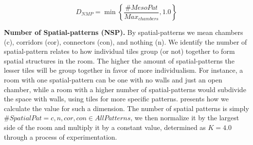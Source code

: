 

\begin{equation} \label{eq:meso-pat-eq}
D_{NMP} = \min \left\{ \dfrac{\#MesoPat}{Max_{chambers}}, 1.0 \right\}
\end{equation}


\textbf{Number of Spatial-patterns (NSP).} By spatial-patterns we mean chambers (c), corridors (cor), connectors (con), and nothing (n). We identify the number of spatial-pattern relates to how individual tiles group (or not) together to form spatial structures in the room. The higher the amount of spatial-patterns the lesser tiles will be group together in favor of more individualism. For instance, a room with one spatial-pattern can be one with no walls and just an open chamber, while a room with a higher number of spatial-patterns would subdivide the space with walls, using tiles for more specific patterns.  presents how we calculate the value for such a dimension. The number of spatial patterns is simply $\#SpatialPat=c, n, cor, con \in AllPatterns$, we then normalize it by the largest side of the room and multiply it by a constant value, determined as $K=4.0$ through a process of experimentation.%




